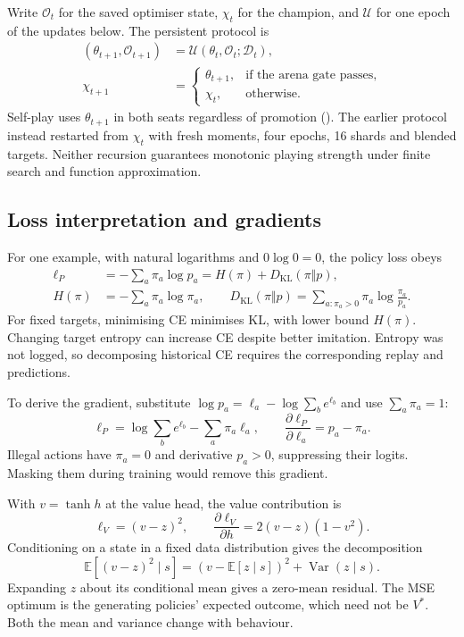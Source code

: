 \documentclass[letterpaper]{article}
\begin{document}
Write $\mathcal O_t$ for the saved optimiser state, $\chi_t$ for the champion,
and $\mathcal U$ for one epoch of the updates below. The persistent protocol is
\begin{align}
 (\theta_{t+1},\mathcal O_{t+1})
   &=\mathcal U(\theta_t,\mathcal O_t;\mathcal D_t),\\
 \chi_{t+1}&=
 \begin{cases}
 \theta_{t+1},&\text{if the arena gate passes},\\
 \chi_t,&\text{otherwise}.
 \end{cases}
 \label{eq:persistence}
\end{align}
Self-play uses $\theta_{t+1}$ in both seats regardless of promotion
(). The earlier protocol instead restarted from $\chi_t$
with fresh moments, four epochs, 16 shards and blended targets.
Neither recursion guarantees monotonic playing strength under finite search and
function approximation.

\subsection{Loss interpretation and gradients}
\label{app:loss-math}
For one example, with natural logarithms and $0\log0=0$, the policy loss obeys
\begin{align}
 \ell_P&=-\sum_a\pi_a\log p_a
       =H(\pi)+D_{\mathrm{KL}}(\pi\Vert p),\\
 H(\pi)&=-\sum_a\pi_a\log\pi_a,\qquad
 D_{\mathrm{KL}}(\pi\Vert p)=\sum_{a:\pi_a>0}\pi_a\log\frac{\pi_a}{p_a}.
 \label{eq:ce-kl}
\end{align}
For fixed targets, minimising CE minimises KL, with lower bound $H(\pi)$.
Changing target entropy can increase CE despite better imitation. Entropy was not
logged, so decomposing historical CE requires the corresponding replay and predictions.

To derive the gradient, substitute
$\log p_a=\ell_a-\log\sum_be^{\ell_b}$ and use $\sum_a\pi_a=1$:
\begin{equation}
 \ell_P=\log\sum_be^{\ell_b}-\sum_a\pi_a\ell_a,
 \qquad \frac{\partial\ell_P}{\partial\ell_a}=p_a-\pi_a.
 \label{eq:policy-gradient}
\end{equation}
Illegal actions have $\pi_a=0$ and derivative $p_a>0$, suppressing their logits.
Masking them during training would remove this gradient.

With $v=\tanh h$ at the value head, the value contribution is
\begin{equation}
 \ell_V=(v-z)^2,\qquad
 \frac{\partial\ell_V}{\partial h}=2(v-z)(1-v^2).
 \label{eq:value-gradient}
\end{equation}
Conditioning on a state in a fixed data distribution gives the decomposition
\begin{equation}
 \mathbb E[(v-z)^2\mid s]
 =(v-\mathbb E[z\mid s])^2+\operatorname{Var}(z\mid s).
 \label{eq:mse-decomposition}
\end{equation}
Expanding $z$ about its conditional mean gives a zero-mean residual.
The MSE optimum is the generating policies' expected outcome, which need not
be $V^*$. Both the mean and variance change with behaviour.
\end{document}
